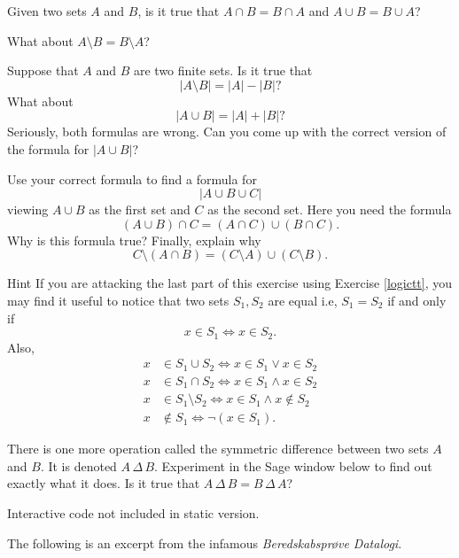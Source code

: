 \begin{exercise}
  Given two sets $A$ and $B$, is it true that
  $A \cap B = B \cap A$ and $A\cup B = B\cup A$?

  What about $A\setminus B = B\setminus A$?

  Suppose that $A$ and $B$ are two finite sets. Is it true that
  $$
    |A\setminus B| = |A| - |B|?
  $$
  What about
  $$
    |A\cup B| = |A| + |B|?
  $$
  Seriously, both formulas are wrong. Can you come up with the correct
  version of the formula for $|A \cup B|$?

  Use your correct formula to find a formula for
  $$
    |A\cup B \cup C|
  $$
  viewing $A\cup B$ as the first set and $C$ as the second set. Here you need
  the formula
  $$
    (A\cup B)\cap C = (A\cap C) \cup (B\cap C).
  $$
  Why is this formula true? Finally, explain why
  $$
    C \setminus (A\cap B) = (C\setminus A) \cup (C\setminus B).
  $$
  \begin{button}{Hint}
    If you are attacking the last part of this exercise using Exercise \ref{logictt}, you
    may find it useful to notice that two sets $S_1, S_2$ are equal i.e, $S_1 = S_2$
    if and only if
    $$
      x\in S_1 \iff x\in S_2.
    $$
    Also,
    \begin{align*}
      x & \in S_1 \cup S_2 \iff x\in S_1 \lor x\in S_2           \\
      x & \in S_1 \cap S_2 \iff x\in S_1 \land x\in S_2          \\
      x & \in S_1 \setminus S_2 \iff x\in S_1 \land x\not\in S_2 \\
      x & \not\in S_1 \iff \neg (x\in S_1).
    \end{align*}
  \end{button}
\end{exercise}

\begin{exercise}
  There is one more operation called the symmetric difference between two sets $A$ and $B$. It is
  denoted $A\, \Delta\, B$. Experiment in the Sage window below to find out exactly what it does.
  Is it true that $A\, \Delta\, B = B\, \Delta\, A$?

  \begin{sage} Interactive code not included in static version.\end{sage}
\end{exercise}

The following is an excerpt from the infamous \emph{Beredskabsprøve Datalogi}.

